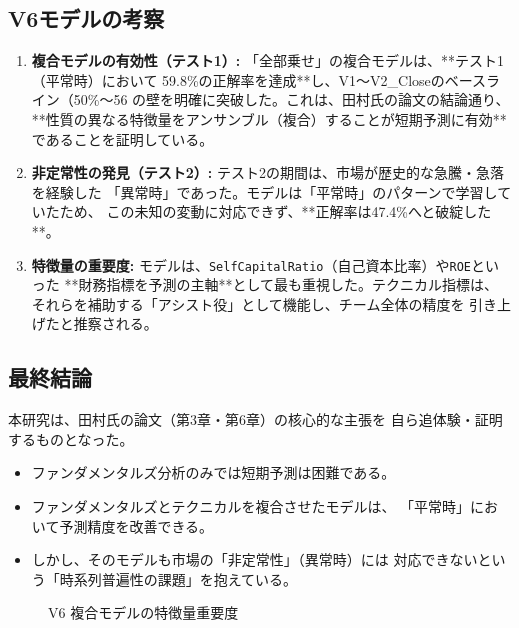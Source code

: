 \documentclass[a4paper, 11pt]{ltjsarticle}
\begin{document}
\subsection*{V6モデルの考察}
\begin{enumerate}
    \item \textbf{複合モデルの有効性（テスト1）:}
    「全部乗せ」の複合モデルは、**テスト1（平常時）において
    59.8\%の正解率を達成**し、V1〜V2\_Closeのベースライン（50\%〜56%
    の壁を明確に突破した。これは、田村氏の論文の結論通り、
    **性質の異なる特徴量をアンサンブル（複合）することが短期予測に有効**
    であることを証明している。

    \item \textbf{非定常性の発見（テスト2）:}
    テスト2の期間は、市場が歴史的な急騰・急落を経験した
    「異常時」であった。モデルは「平常時」のパターンで学習していたため、
    この未知の変動に対応できず、**正解率は47.4\%へと破綻した**。

    \item \textbf{特徴量の重要度:}
    モデルは、\texttt{SelfCapitalRatio}（自己資本比率）や\texttt{ROE}といった
    **財務指標を予測の主軸**として最も重視した。テクニカル指標は、
    それらを補助する「アシスト役」として機能し、チーム全体の精度を
    引き上げたと推察される。
\end{enumerate}

\subsection*{最終結論}
本研究は、田村氏の論文（第3章・第6章）の核心的な主張を
自ら追体験・証明するものとなった。
\begin{itemize}
    \item ファンダメンタルズ分析のみでは短期予測は困難である。
    \item ファンダメンタルズとテクニカルを複合させたモデルは、
    「平常時」において予測精度を改善できる。
    \item しかし、そのモデルも市場の「非定常性」（異常時）には
    対応できないという「時系列普遍性の課題」を抱えている。
\end{itemize}

\begin{figure}[h]
  \centering
  \caption{V6 複合モデルの特徴量重要度}
\end{figure}
\end{document}
